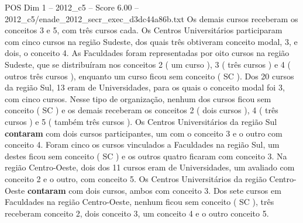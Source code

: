 \begin{textsample}{POS Dim 1 – 2012\_c5 – Score 6.00 – 2012\_c5/enade\_2012\_secr\_exec\_d3dc44a86b.txt}
Os demais cursos receberam os conceitos 3 e 5, com três cursos cada.
Os Centros Universitários participaram com cinco cursos na região Sudeste, dos quais três obtiveram conceito modal, 3, e dois, o conceito 4.
As Faculdades foram representadas por oito cursos na região Sudeste, que se distribuíram nos conceitos 2 ( um curso ), 3 ( três cursos ) e 4 ( outros três cursos ), enquanto um curso ficou sem conceito ( SC ).
Dos 20 cursos da região Sul, 13 eram de Universidades, para os quais o conceito modal foi 3, com cinco cursos.
Nesse tipo de organização, nenhum dos cursos ficou sem conceito ( SC ) e os demais receberam os conceitos 2 ( dois cursos ), 4 ( três cursos ) e 5 ( também três cursos ).
Os Centros Universitários da região Sul \textbf{contaram} com dois cursos participantes, um com o conceito 3 e o outro com conceito 4.
Foram cinco os cursos vinculados a Faculdades na região Sul, um destes ficou sem conceito ( SC ) e os outros quatro ficaram com conceito 3.
Na região Centro-Oeste, dois dos 11 cursos eram de Universidades, um avaliado com conceito 2 e o outro, com conceito 5.
Os Centros Universitários da região Centro-Oeste \textbf{contaram} com dois cursos, ambos com conceito 3.
Dos sete cursos em Faculdades na região Centro-Oeste, nenhum ficou sem conceito ( SC ), três receberam conceito 2, dois conceito 3, um conceito 4 e o outro conceito 5.

\end{textsample}
